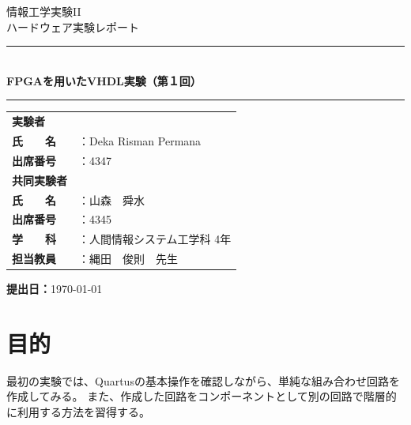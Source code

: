 \documentclass[12pt,a4paper]{ltjsarticle}
\title{}
\date{}
\author{}
\newcommand{\HRule}{\rule{\linewidth}{0.5mm}}
\begin{document}

\begin{titlepage}
  \thispagestyle{titlepage}
  \centering
  \vspace*{2cm}

  {\large 情報工学実験II}\\[0.5em]
  {\large ハードウェア実験レポート}\\[2em]

  \HRule{}\\[1em]
  {\LARGE \textbf{FPGAを用いたVHDL実験（第１回）}}\\[0.5em]
  \HRule{}

  \vspace{3cm}

  \begin{tabular}{ll}
    \textbf{実験者} & \\[0.8em]
    \textbf{氏　　名} & ：Deka Risman Permana \\[0.4em]
    \textbf{出席番号} & ：4347 \\[1.2em]

    \textbf{共同実験者} & \\[0.8em]
    \textbf{氏　　名} & ：山森　舜水 \\[0.4em]
    \textbf{出席番号} & ：4345 \\[1.2em]

    \textbf{学　　科} & ：人間情報システム工学科 4年 \\[0.4em]
    \textbf{担当教員} & ：縄田　俊則　先生 \\
  \end{tabular}

  \vfill

  \textbf{提出日：}\today

\end{titlepage}

\newpage
\thispagestyle{frontmatter}
\tableofcontents

\newpage
{}
\setcounter{page}{1}


\section{目的}\label{sec:objective}
最初の実験では、Quartusの基本操作を確認しながら、単純な組み合わせ回路を作成してみる。
また、作成した回路をコンポーネントとして別の回路で階層的に利用する方法を習得する。
\end{document}
